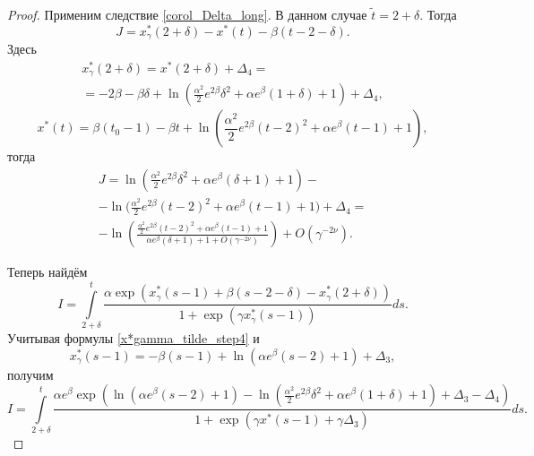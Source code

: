 \begin{proof}
%
Применим следствие \ref{corol_Delta_long}. В данном случае $\tilde{t} = 2 + \delta$.
Тогда
%
\[
J = x_\gamma^*(2 + \delta) - x^*(t) - \beta(t - 2 - \delta).
\]
%
Здесь
\begin{multline}
	\label{x*gamma_tilde_step4}
	x_\gamma^*(2 + \delta) = x^*(2 + \delta) + \Delta_4 = \\
	= -2 \beta - \beta \delta + \ln\left(\frac{\alpha^2}{2} e^{2\beta} \delta^2 + \alpha e^{\beta} (1 + \delta) + 1 \right) + \Delta_4,
\end{multline}
%
\[ %
x^*(t) = \beta(t_0 - 1) - \beta t + \ln\left(\frac{\alpha^2}{2} e^{2\beta}(t - 2)^2 + \alpha e^{\beta}(t - 1) + 1\right),
\]
%
тогда
\begin{multline}
	\label{J_step5}
	J = \ln\left(\frac{\alpha^2}{2}e^{2\beta}\delta^2 + \alpha e^{\beta}(\delta + 1) + 1 \right) -\\- \ln\Big(\frac{\alpha^2}{2}e^{2\beta}(t - 2)^2+\alpha e^{\beta}(t - 1) + 1 \Big) + \Delta_4=
	\\
	-\ln\left(\frac{\frac{\alpha^2}{2}e^{2\beta}(t - 2)^2+\alpha e^{\beta}(t - 1) + 1}{\alpha e^{\beta}(\delta + 1) + 1 + O(\gamma^{-2\nu})}\right) + O(\gamma^{-2\nu}).
\end{multline}

Теперь найдём
\begin{equation*}
	I = \int\limits_{2 + \delta}^{t} \frac{\alpha \exp(x_\gamma^*(s - 1) + \beta(s - 2 - \delta) - x_\gamma^*(2 + \delta))}{1 + \exp(\gamma x_\gamma^*(s - 1))}ds.
\end{equation*}
Учитывая формулы \eqref{x*gamma_tilde_step4} и
%
\[
x_\gamma^*(s-1) = -\beta (s - 1) + \ln(\alpha e^{\beta}(s - 2) + 1) + \Delta_3,
\]
%
получим
%
\small
\begin{equation*}
	I = \int\limits_{2 + \delta}^{t}\frac{\alpha e^\beta \exp\left( \ln(\alpha e^{\beta}(s - 2) + 1) - \ln(\frac{\alpha^2}{2} e^{2\beta} \delta^2 + \alpha e^{\beta}(1 + \delta) + 1) + \Delta_3 - \Delta_4 \right)}{1 + \exp\left(\gamma x^*(s-1)  +\gamma\Delta_3\right)} ds.
\end{equation*}
\normalsize


\end{proof}
